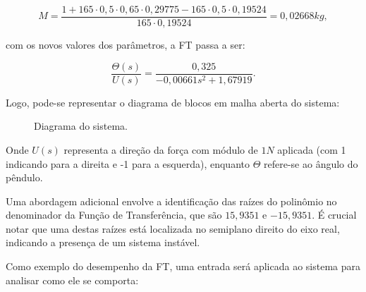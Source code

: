 \documentclass[12pt,           %
a4paper,                       %
openany,                       %
oneside,                       %
chapter=TITLE,                 %
english,                       %
spanish,                       %
brazil,                        %
sumario=tradicional]{abntex2}  %
\begin{document}
\begin{OnehalfSpace}
\begin{equation}
    M = \frac{1 + 165\cdot0,5\cdot0,65\cdot0,29775-165\cdot0,5\cdot0,19524}{165\cdot0,19524} = 0,02668 kg,
    \label{eq:MV}
\end{equation}

\noindent com os novos valores dos parâmetros, a FT passa a ser:

\begin{equation}
     \frac{\Theta (s)}{U(s)} = \frac{0,325}{-0,00661s^2 +  1,67919}.
    \label{eq:31}
\end{equation}

Logo, pode-se representar o diagrama de blocos em malha aberta do sistema:

\begin{figure}[H]
\centering
\vspace*{-.2cm}
\caption{Diagrama do sistema.}
\label{blocos}
\end{figure}
\vspace*{-.65cm}
{\raggedright {}}

Onde $U(s)$ representa a direção da força com módulo de $1N$ aplicada (com 1 indicando para a direita e -1 para a esquerda), enquanto $\Theta$ refere-se ao ângulo do pêndulo.

Uma abordagem adicional envolve a identificação das raízes do polinômio no denominador da Função de Transferência, que são $15,9351$ e $-15,9351$. É crucial notar que uma destas raízes está localizada no semiplano direito do eixo real, indicando a presença de um sistema instável.

Como exemplo do desempenho da FT, uma entrada será aplicada ao sistema para analisar como ele se comporta:


\end{OnehalfSpace}
\end{document}
